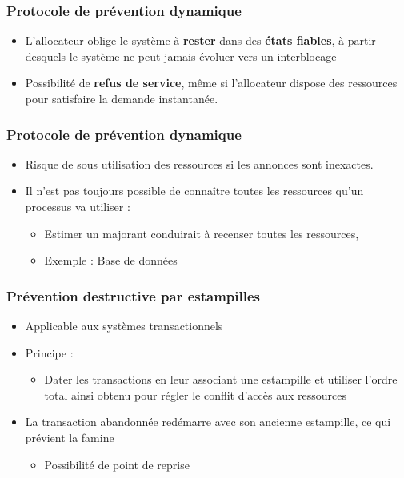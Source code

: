 \begin{frame}
\frametitle{Protocole de prévention dynamique}
\begin{itemize}
\item L'allocateur oblige le système à \textbf{rester} dans des \textbf{états fiables}, à partir desquels le système ne peut jamais évoluer vers un interblocage
\item Possibilité de \textbf{refus de service}, même si l'allocateur dispose des ressources pour satisfaire la demande instantanée.
\end{itemize}
\end{frame}

\begin{frame}
\frametitle{Protocole de prévention dynamique}
\begin{itemize}
\item Risque de sous utilisation des ressources si les annonces sont inexactes.
\item Il n'est pas toujours possible de connaître toutes les ressources qu'un processus va utiliser :
\begin{itemize}
\item Estimer un majorant conduirait à recenser toutes les ressources,
\item Exemple : Base de données
\end{itemize}
\end{itemize}
\end{frame}

\begin{frame}
\frametitle{Prévention destructive par estampilles}
\begin{itemize}
\item Applicable aux systèmes transactionnels
\item Principe :
\begin{itemize}
\item Dater les transactions en leur associant une estampille et utiliser l'ordre total ainsi obtenu pour régler le conflit d'accès aux ressources
\end{itemize}
\item La transaction abandonnée redémarre avec son ancienne estampille, ce qui prévient la famine
\begin{itemize}
\item Possibilité de point de reprise
\end{itemize}
\end{itemize}
\end{frame}

